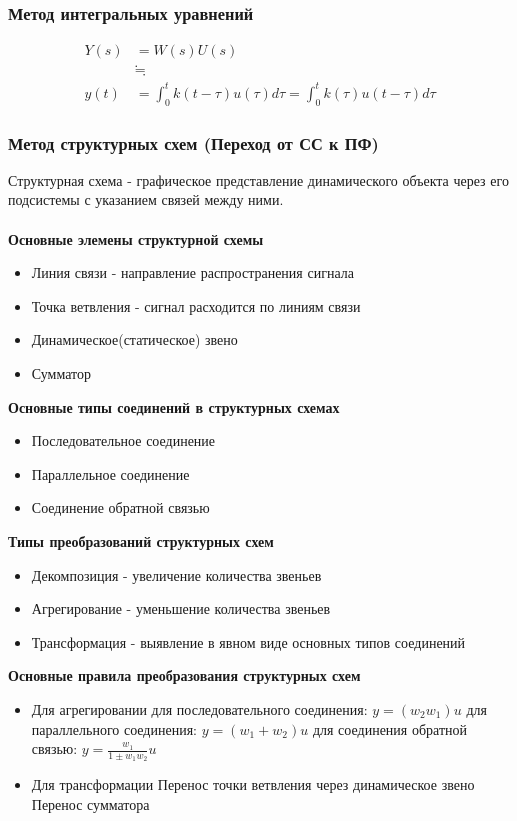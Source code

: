 \documentclass[A4]{article}
\begin{document}
\subsubsection{Метод интегральных уравнений}
\begin{equation}
\begin{aligned}
Y(s)&=W(s)U(s)\\
&\fallingdotseq\\
y(t)&=\int_{0}^{t}k(t-\tau)u(\tau)d\tau=\int_{0}^{t}k(\tau)u(t-\tau)d\tau
\end{aligned}
\end{equation}
\subsubsection{Метод структурных схем (Переход от СС к ПФ)}
Структурная схема - графическое представление динамического объекта через его подсистемы с указанием связей между ними.\\
\\
\textbf{Основные элемены структурной схемы}
\begin{itemize}
	\item Линия связи - направление распространения сигнала
	\item Точка ветвления - сигнал расходится по линиям связи
	\item Динамическое(статическое) звено
	\item Сумматор
\end{itemize}
\textbf{Основные типы соединений в структурных схемах}
\begin{itemize}
	\item Последовательное соединение
	\item Параллельное соединение
	\item Соединение обратной связью
\end{itemize}
\textbf{Типы преобразований структурных схем}
\begin{itemize}
	\item Декомпозиция - увеличение количества звеньев
	\item Агрегирование - уменьшение количества звеньев
	\item Трансформация - выявление в явном виде основных типов соединений
\end{itemize}
\textbf{Основные правила преобразования структурных схем}
\begin{itemize}
	\item Для агрегировании
	\subitem для последовательного соединения: $y=(w_2w_1)u$
	\subitem для параллельного соединения: $y=(w_1+w_2)u$
	\subitem для соединения обратной связью: $y=\frac{w_1}{1\pm w_1w_2}u$
	\item Для трансформации
	\subitem Перенос точки ветвления через динамическое звено
	\subitem Перенос сумматора
\end{itemize}
\end{document}
